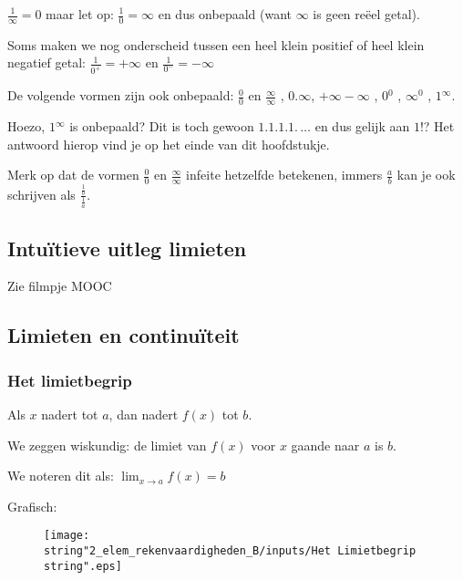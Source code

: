 \medskip{}


\noindent $\frac{1}{\infty}=0$ maar let op: $\frac{1}{0}=\infty$
en dus onbepaald (want $\infty$ is geen re\"eel getal).

\noindent Soms maken we nog onderscheid tussen een heel klein positief
of heel klein negatief getal: $\frac{1}{0^{+}}=+\infty$ en $\frac{1}{0^{-}}=-\infty$

\medskip{}


\noindent De volgende vormen zijn ook onbepaald: $\frac{0}{0}$ en
$\frac{\infty}{\infty}$ , $0.\infty$, $+\infty-\infty$ , $0{}^{0}$
, $\infty{}^{0}$ , $1{}^{\infty}$.

\noindent Hoezo, $1{}^{\infty}$ is onbepaald? Dit is toch gewoon
$1.1.1.1.\,\ldots$ en dus gelijk aan $1$!? Het antwoord hierop vind
je op het einde van dit hoofdstukje.

\medskip{}


\noindent Merk op dat de vormen $\frac{0}{0}$ en $\frac{\infty}{\infty}$
infeite hetzelfde betekenen, immers $\frac{a}{b}$ kan je ook schrijven
als $\frac{\frac{1}{b}}{\frac{1}{a}}$.

\subsection{Intu\"itieve uitleg limieten}
Zie filmpje MOOC

\subsection{Limieten en continu\"iteit}


\subsubsection{Het limietbegrip}

Als $x$ nadert tot $a$, dan nadert $f(x)$ tot $b$.

\noindent We zeggen wiskundig: de limiet van $f(x)$ voor $x$ gaande
naar $a$ is $b$.

\noindent We noteren dit als: ${\displaystyle \lim_{x\to a}}f(x)=b$

\noindent Grafisch:

\begin{figure}[h]
\centering{}\texttt{[image: \\string"2\_elem\_rekenvaardigheden\_B/inputs/Het Limietbegrip\\string".eps]} 
\end{figure}


\medskip{}


